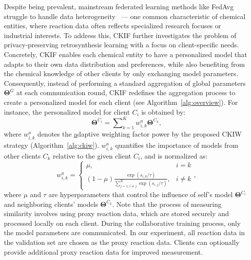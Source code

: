 Despite being prevalent, mainstream federated learning methods like FedAvg struggle to handle data heterogeneity~\citep{wang2019federated,huang2021personalized} --- one common characteristic of chemical entities, where reaction data often reflects specialized research focuses or industrial interests. To address this, CKIF further investigates the problem of privacy-preserving retrosynthesis learning with a focus on client-specific needs. Concretely, CKIF enables each chemical entity to have a personalized model that adapts to their own data distribution and preferences, while also benefiting from the chemical knowledge of other clients by only exchanging model parameters. Consequently, instead of performing a standard aggregation of global parameters $\bm{\Theta}^{G}$ at each communication round, CKIF redefines the aggregation process to create a personalized model for each client (see Algorithm~\ref{alg:overview}). For instance, the personalized model for client $C_i$ is obtained by:
\begin{equation}
     \bm{\Theta}^{C_i} = \sum\nolimits_{k=1}^{K} w_{i,k}^a \bm{\Theta}^{C_k},
\end{equation}
where $w_{i,k}^a$ denotes the \underline{a}daptive weighting factor power by the proposed CKIW strategy (Algorithm~\ref{alg:ckiw}). $w_{i,k}^a$ quantifies the importance of models from other clients $C_k$ relative to the given client $C_i$, and is normalized as:
\begin{equation}
    w_{i,k}^a=\begin{cases}\mu,& i = k \\
    (1-\mu)\frac{\exp(s_{i,k} / \tau)}{\sum_{j=1,i\neq j}^{K}\exp(s_{i,j}/ \tau)},& i \neq k\end{cases},
\end{equation}
where $\mu$ and $\tau$ are hyperparameters that control the influence of self's model $\bm{\Theta}^{C_i}$ and neighboring clients' models $\bm{\Theta}^{C_k}$.  Note that the process of measuring similarity involves using proxy reaction data, which are stored securely and processed locally on each client. During the collaborative training process, only the model parameters are communicated. In our experiment, all reaction data in the validation set are chosen as the proxy reaction data. Clients can optionally provide additional proxy reaction data for improved measurement.

